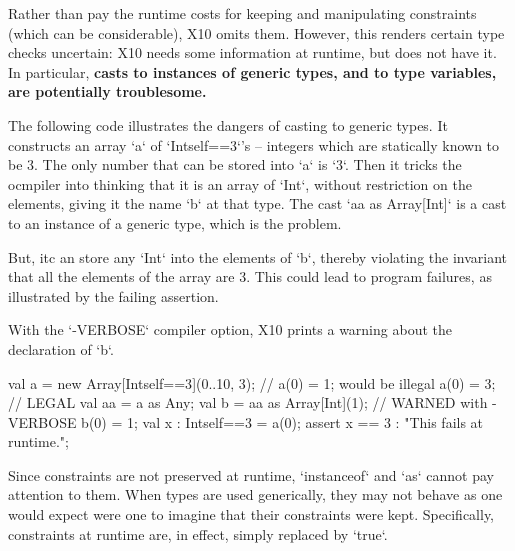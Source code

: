Rather than pay the runtime costs for keeping and manipulating constraints
(which can be considerable), X10 omits them.
However, this renders certain type checks uncertain: X10 needs some
information at runtime, but does not have it.    In particular, {\bf casts to
instances of generic types, and to type variables, are potentially troublesome.}


\begin{ex}
The following code illustrates the dangers of casting to generic types. 
It constructs an array \xcd`a` of \xcd`Int{self==3}`'s -- integers
which 
are statically known to be 3. 
The only number that can be stored into \xcd`a` is \xcd`3`.  
Then it tricks the ocmpiler into 
thinking that it is an array of \xcd`Int`, without restriction on the
elements, giving it the name \xcd`b` at that type.  
The cast \xcd`aa as Array[Int]` is a cast to an instance of a generic type,
which is the problem. 

But, itc an store any \xcd`Int` into the elements of 
\xcd`b`, thereby violating 
the invariant that all the elements of the array are 3.  
This could lead to program failures, as illustrated by the failing assertion.  

With the \xcd`-VERBOSE` compiler option, X10 prints a warning about the
declaration of \xcd`b`.  
\begin{xten}
  val a = new Array[Int{self==3}](0..10, 3);
  // a(0) = 1; would be illegal
  a(0) = 3; // LEGAL
  val aa = a as Any;
  val b = aa as Array[Int](1); // WARNED with -VERBOSE
  b(0) = 1;
  val x : Int{self==3} = a(0);
  assert x == 3 : "This fails at runtime.";
\end{xten}
\end{ex}

\label{sect:StrippedGenericCasts}

Since constraints are not preserved at runtime, \xcd`instanceof` and \xcd`as`
cannot pay attention to them.  When types are used generically,
they may not behave as one would expect were one to imagine that their
constraints were kept.  Specifically, constraints at runtime are, in effect,
simply replaced by \xcd`true`.

